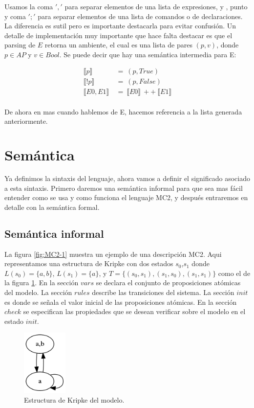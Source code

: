 \noindent Usamos la coma $','$ para separar elementos de una lista de expresiones, y , punto y coma $';'$ para separar elementos de una lista de comandos o de declaraciones. La diferencia es sutil pero es importante destacarla para evitar confusión.
Un detalle de implementación muy importante que hace falta destacar es que el parsing de $E$ retorna un ambiente, el cual es una lista de pares $(p,v)$, donde $p \in AP$ y $v \in Bool$. Se puede decir que hay una semántica intermedia para E:

\begin{align*}
\llbracket p \rrbracket \ &=\ (p,True)\\
\llbracket !p \rrbracket \ &=\ (p,False) \\
\llbracket E0,E1 \rrbracket \ &=\ \llbracket E0 \rrbracket \ ++\ \llbracket E1 \rrbracket  \\
\end{align*}

De ahora en mas cuando hablemos de E, hacemos referencia a la lista generada anteriormente.

\section{Semántica}

Ya definimos la sintaxis del lenguaje, ahora vamos a definir el significado asociado a esta sintaxis. Primero daremos una semántica informal para que sea mas fácil entender como se usa y como funciona el lenguaje MC2, y después entraremos en detalle con la semántica formal.

\subsection{Semántica informal}

La figura \ref{fig:MC2-1} muestra un ejemplo de una descripción MC2. Aqui representamos una estructura de Kripke con dos estados $s_{0}$,$s_{1}$ donde $L(s_{0}) = \{a,b\}$, $L(s_{1}) = \{a\}$, y $T = \{(s_{0},s_{1}),(s_{1},s_{0}),(s_{1},s_{1})\}$ como el de la figura \ref{fig:kripke4}. En la sección $vars$ se declara el conjunto de proposiciones atómicas del modelo. La sección $rules$ describe las transiciones del sistema. La sección $init$ es donde se señala el valor inicial de las proposiciones atómicas. En la sección $check$ se especifican las propiedades que se desean verificar sobre el modelo en el estado $init$.

\begin{figure}[H]
  \centering
  \includegraphics[width=0.2\textwidth]{Figures/kripke4.png}
  \caption{Estructura de Kripke del modelo.}
  \label{fig:kripke4}
\end{figure}

